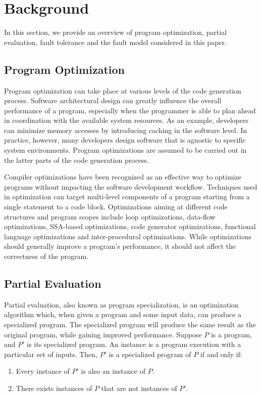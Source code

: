 \section{Background}
\label{sec:background}

In this section, we provide an overview of program optimization, partial evaluation, fault tolerance and the fault model considered in this paper.

\subsection{Program Optimization}
\label{sec:program_opt}
Program optimization can take place at various levels of the code generation process.
Software architectural design can greatly influence the overall performance of a program, especially when the programmer is able to plan ahead in coordination with the available system resources.
As an example, developers can minimize memory accesses by introducing caching in the software level.
In practice, however, many developers design software that is agnostic to specific system environments.
Program optimizations are assumed to be carried out in the latter parts of the code generation process. 

Compiler optimizations have been recognized as an effective way to optimize programs without impacting the software development workflow.
Techniques used in optimization can target multi-level components of a program starting from a single statement to a code block. 
Optimizations aiming at different code structures and program scopes include loop optimizations, data-flow optimizations, SSA-based optimizations, code generator optimizations, functional language optimizations and inter-procedural optimizations. While optimizations should generally improve a program's performance, it should not affect the correctness of the program.

\subsection{Partial Evaluation}
\label{sec:partial_evaluation}
Partial evaluation, also known as program specialization, is an optimization algorithm which, when given a program and some input data, can produce a specialized program. The specialized program will produce the same result as the original program, while gaining improved performance. Suppose $P$ is a program, and $P'$ is its specialized program. An instance is a program execution with a particular set of inputs. Then, $P'$ is a specialized program of $P$ if and only if:
\begin{enumerate}
\item Every instance of $P'$ is also an instance of $P$.
\item There exists instances of $P$ that are not instances of $P'$.
\end{enumerate}

